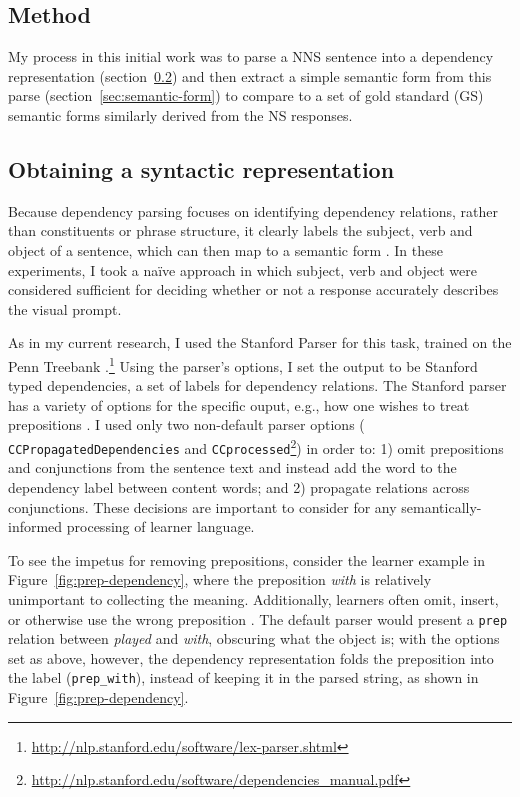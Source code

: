 \subsection{Method}
\label{sec:method}

My process in this initial work was to parse a NNS sentence into a dependency representation
(section~\ref{sec:syntactic-form})
and then extract a simple semantic
form from this parse
(section~\ref{sec:semantic-form})
to compare to a set of gold standard (GS) semantic forms similarly derived from the NS responses.

\subsection{Obtaining a syntactic representation}
\label{sec:syntactic-form}
Because dependency parsing focuses on identifying dependency
relations, rather than constituents or phrase structure, it clearly
labels the subject, verb and object of a sentence, which can then map
to a semantic form \citep{Kuebler.McDonald.Nivre-09}. In these experiments, I took a na\"ive approach in which subject, verb and
object were considered sufficient for deciding whether or not a
response accurately describes the visual prompt.

As in my current research, I used the Stanford Parser for this task, trained on the Penn Treebank 
\citep{demarneffe:ea:06, 
klein:manning:03}.\footnote{\url{http://nlp.stanford.edu/software/lex-parser.shtml}} 
%
Using the parser's options, I set the output to be Stanford typed
dependencies, a set of labels for dependency relations. The Stanford
parser has a variety of options for the specific
ouput, e.g., how one wishes to treat prepositions
\citep{defmarneffe:manning:12}.  I used only two non-default parser options ({\tt
  CCPropagatedDependencies} and {\tt CCprocessed}\footnote{\url{http://nlp.stanford.edu/software/dependencies_manual.pdf}}) in order to:
%
1) omit prepositions and conjunctions from the sentence text and
instead add the word to the dependency label between content words;
and 2) propagate relations across conjunctions.  These decisions
are important to consider for any semantically-informed processing of
learner language.

To see the impetus for removing prepositions, consider the learner
example in Figure~\ref{fig:prep-dependency}, where the preposition \textit{with} is
relatively unimportant to collecting the meaning.  Additionally,
learners often omit, insert, or otherwise use the wrong preposition
\citep{chodorow:et:al:07}.  The default parser would present a
\texttt{prep} relation between \textit{played} and \textit{with},
obscuring what the object is; with the options set as above, however,
the dependency representation folds the preposition into the label
(\texttt{prep\_with}), instead of keeping it in the parsed string, as
shown in Figure~\ref{fig:prep-dependency}.

